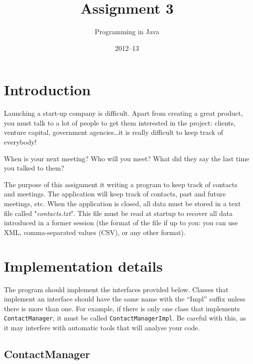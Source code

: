 \documentclass{article}
\title{Assignment 3}
\author{Programming in Java}
\date{2012--13}
\begin{document}
\maketitle

\section{Introduction}
\label{sec:introduction}

Launching a start-up company is difficult. Apart from creating a great
product, you must talk to a lot of people to get them interested in
the project: clients, venture capital, government agencies\ldots it is
really difficult to keep track of everybody! 

When is your next meeting? Who will you meet? What did they say the
last time you talked to them?

The purpose of this assignment it writing a program to keep track of
contacts and meetings. The application will keep track of contacts,
past and future meetings, etc. When the application is closed, all
data must be stored in a text file called "\emph{contacts.txt}". This
file must be read at startup to recover all data introduced in a
former session (the format of the file if up to you: you can use XML,
comma-separated values (CSV), or any other format).

\section{Implementation details}
\label{sec:impl-deta}

The program should implement the interfaces
provided below. Classes that implement an interface should have the same
name with the ``Impl'' suffix unless there is more than one. For
example, if there is only one class that implements
\verb+ContactManager+, it must be called \verb+ContactManagerImpl+. Be
careful with this, as it may interfere with automatic tools that will
analyse your code. 

\subsection{ContactManager}
\label{sec:contactmanager}
\end{document}
